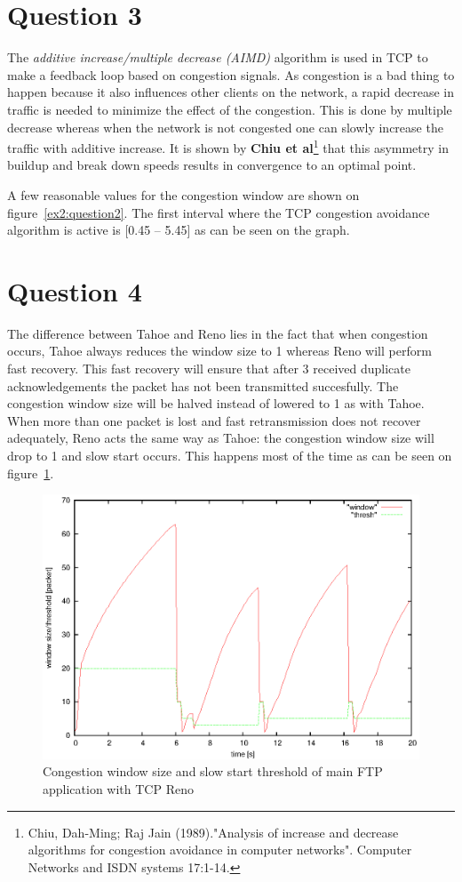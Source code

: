 \documentclass[a4paper]{report}
\begin{document}
\section*{Question 3}
The \textit{additive increase/multiple decrease (AIMD)} algorithm is used in TCP to make a feedback loop based on congestion signals. As congestion is a bad thing to happen because it also influences other clients on the network, a rapid decrease in traffic is needed to minimize the effect of the congestion. This is done by multiple decrease whereas when the network is not congested one can slowly increase the traffic with additive increase. It is shown by \textbf{Chiu et al}\footnote{Chiu, Dah-Ming; Raj Jain (1989)."Analysis of increase and decrease algorithms for congestion avoidance in computer networks". Computer Networks and ISDN systems 17:1-14.} that this asymmetry in buildup and break down speeds results in convergence to an optimal point.

A few reasonable values for the congestion window are shown on figure~\ref{ex2:question2}.
The first interval where the TCP congestion avoidance algorithm is active is [0.45 – 5.45] as can be seen on the graph.

\section*{Question 4}
The difference between Tahoe and Reno lies in the fact that when congestion occurs, Tahoe always reduces the window size to 1 whereas Reno will perform fast recovery. This fast recovery will ensure that after 3 received duplicate acknowledgements the packet has not been transmitted succesfully. The congestion window size will be halved instead of lowered to 1 as with Tahoe. When more than one packet is lost and fast retransmission does not recover adequately, Reno acts the same way as Tahoe: the congestion window size will drop to 1 and slow start occurs. This happens most of the time as can be seen on figure~\ref{ex2:question4}.
\begin{figure}[h]
\centerline{\includegraphics{pictures/E2Q4.eps}}
\caption{Congestion window size and slow start threshold of main FTP application with TCP Reno}
\label{ex2:question4}
\end{figure}
\end{document}
